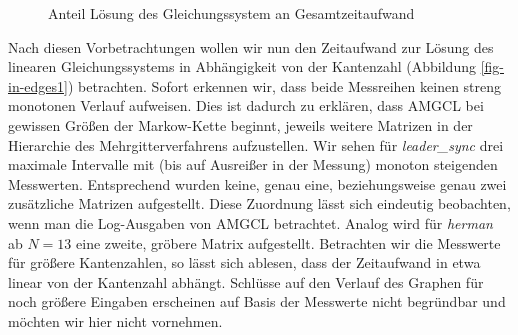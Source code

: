 \documentclass[a4paper]{article}
\newcommand{\mc}{Markow-Kette}
\theoremstyle{nonumberplain}
\begin{document}
\begin{figure}
	\caption{Anteil Lösung des Gleichungssystem an Gesamtzeitaufwand}
	\label{fig-percentage}
	\centering
\end{figure}


Nach diesen Vorbetrachtungen wollen wir nun den Zeitaufwand zur Lösung des linearen Gleichungssystems in Abhängigkeit von der Kantenzahl (Abbildung \ref{fig-in-edges1})  betrachten. Sofort erkennen wir, dass beide Messreihen keinen streng monotonen Verlauf aufweisen. Dies ist dadurch zu erklären, dass AMGCL bei gewissen Größen der \mc{} beginnt, jeweils weitere Matrizen in der Hierarchie des Mehrgitterverfahrens aufzustellen. Wir sehen für \textit{leader\_sync} drei maximale Intervalle mit (bis auf Ausreißer in der Messung) monoton steigenden Messwerten. Entsprechend wurden keine, genau eine, beziehungsweise genau zwei zusätzliche Matrizen aufgestellt. Diese Zuordnung lässt sich eindeutig beobachten, wenn man die Log-Ausgaben von AMGCL betrachtet. Analog wird für \textit{herman} ab $N=13$ eine zweite, gröbere Matrix aufgestellt. Betrachten wir die Messwerte für größere Kantenzahlen, so lässt sich ablesen, dass der Zeitaufwand in etwa linear von der Kantenzahl abhängt. Schlüsse auf den Verlauf des Graphen für noch größere Eingaben erscheinen auf Basis der Messwerte nicht begründbar und möchten wir hier nicht vornehmen.
\end{document}
